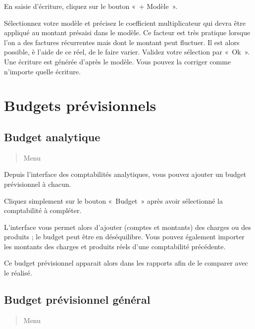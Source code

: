 \documentclass[a4paper,10pt,oneside,french]{sphinxmanual}
\begin{document}
\sphinxAtStartPar
En saisie d’écriture, cliquez sur le bouton « + Modèle ».
\begin{quote}

\noindent{}
\end{quote}

\sphinxAtStartPar
Sélectionnez votre modèle et précisez le coefficient multiplicateur qui devra être appliqué au montant présaisi dans le modèle. Ce facteur est très pratique lorsque l’on a des factures récurrentes mais dont le montant peut fluctuer. Il est alors possible, è l’aide de ce réel, de le faire varier.
Validez votre sélection par « Ok ». Une écriture est générée d’après le modèle. Vous pouvez la corriger comme n’importe quelle écriture.

\sphinxstepscope


\section{Budgets prévisionnels}
\label{\detokenize{accounting/budget:budgets-previsionnels}}\label{\detokenize{accounting/budget::doc}}

\subsection{Budget analytique}
\label{\detokenize{accounting/budget:budget-analytique}}\begin{quote}

\sphinxAtStartPar
Menu 
\end{quote}

\sphinxAtStartPar
Depuis l’interface des comptabilités analytiques, vous pouvez ajouter un budget prévisionnel à chacun.

\sphinxAtStartPar
Cliquez simplement sur le bouton « Budget » après avoir sélectionné la comptabilité à compléter.

\sphinxAtStartPar
L’interface vous permet alors d’ajouter (comptes et montants) des charges ou des produits ; le budget peut être en déséquilibre.
Vous pouvez également importer les montants des charges et produits réels d’une comptabilité précédente.

\sphinxAtStartPar
Ce budget prévisionnel apparait alors dans les rapports afin de le comparer avec le réalisé.


\subsection{Budget prévisionnel général}
\label{\detokenize{accounting/budget:budget-previsionnel-general}}\begin{quote}

\sphinxAtStartPar
Menu 
\end{quote}
\end{document}
